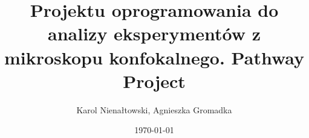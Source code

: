 \documentclass{article}
\author{Karol Nienałtowski, Agnieszka Gromadka}
\title{Projektu oprogramowania do analizy eksperymentów z mikroskopu konfokalnego. Pathway Project}
\date{\today}
\begin{document}
\maketitle

\begin{abstract}
\end{abstract}



%






%
%

%

%

\appendix

%

%
\end{document}
